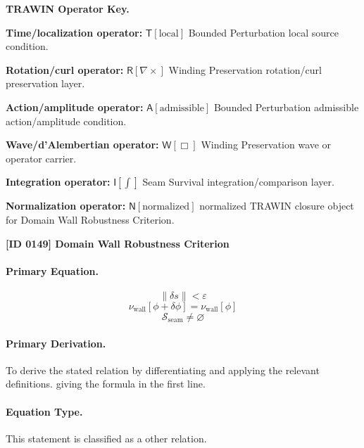 \par\vspace{0.45\baselineskip}
\noindent\begin{minipage}[t]{\linewidth}
\begingroup
\small
\raggedright
\textbf{TRAWIN Operator Key.}\par
\noindent\textbf{Time/localization operator:} $\mathsf{T}\!\left[\mathrm{local}\right]$ Bounded Perturbation local source condition.\par
\noindent\textbf{Rotation/curl operator:} $\mathsf{R}\!\left[\nabla\times\right]$ Winding Preservation rotation/curl preservation layer.\par
\noindent\textbf{Action/amplitude operator:} $\mathsf{A}\!\left[\mathrm{admissible}\right]$ Bounded Perturbation admissible action/amplitude condition.\par
\noindent\textbf{Wave/d'Alembertian operator:} $\mathsf{W}\!\left[\Box\right]$ Winding Preservation wave or operator carrier.\par
\noindent\textbf{Integration operator:} $\mathsf{I}\!\left[\int\right]$ Seam Survival integration/comparison layer.\par
\noindent\textbf{Normalization operator:} $\mathsf{N}\!\left[\mathrm{normalized}\right]$ normalized TRAWIN closure object for Domain Wall Robustness Criterion.\par
\endgroup
\end{minipage}

\clearpage
\noindent\textbf{[ID 0149] Domain Wall Robustness Criterion}\par
\vspace{0.35em}
\paragraph{Primary Equation.}
\[
\|\delta s\|<\varepsilon
\]
\[
\nu_{\mathrm{wall}}[\phi+\delta\phi]=\nu_{\mathrm{wall}}[\phi]
\]
\[
\mathcal{S}_{\mathrm{seam}}\neq \varnothing
\]

\paragraph{Primary Derivation.}
To derive the stated relation by differentiating and applying the relevant definitions. giving the formula in the first line.
\paragraph{Equation Type.}
This statement is classified as a other relation.

